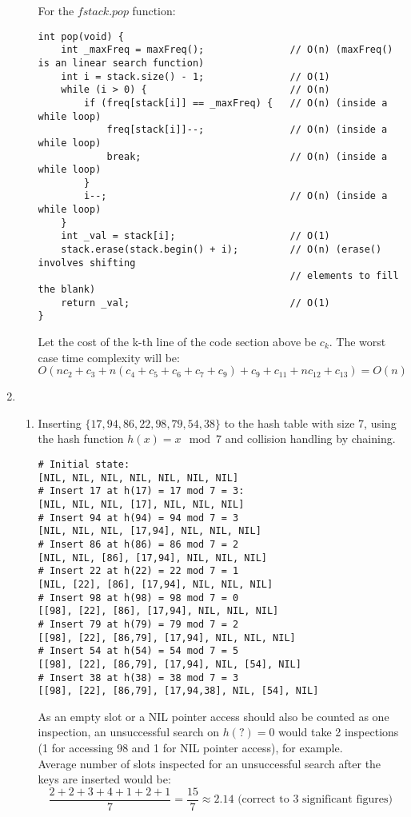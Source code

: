 \documentclass{article}
\begin{document}
\begin{enumerate}
\begin{enumerate}[label=(\alph*)]
        For the $fstack.pop$ function:
        \begin{verbatim}
int pop(void) {
    int _maxFreq = maxFreq();               // O(n) (maxFreq() is an linear search function)
    int i = stack.size() - 1;               // O(1)
    while (i > 0) {                         // O(n)
        if (freq[stack[i]] == _maxFreq) {   // O(n) (inside a while loop)
            freq[stack[i]]--;               // O(n) (inside a while loop)
            break;                          // O(n) (inside a while loop)
        }
        i--;                                // O(n) (inside a while loop)
    }
    int _val = stack[i];                    // O(1)
    stack.erase(stack.begin() + i);         // O(n) (erase() involves shifting
                                            // elements to fill the blank)
    return _val;                            // O(1)
}
        \end{verbatim}
        Let the cost of the k-th line of the code section above be $c_k$. The worst case time complexity will be:
        \[
        O(nc_2+c_3+n(c_4+c_5+c_6+c_7+c_9)+c_9+c_{11}+nc_{12}+c_{13}) = O(n)
        \]
    \end{enumerate}

\item
    \begin{enumerate}[label=(\alph*)]
        \item Inserting $\{17,94,86,22,98,79,54,38\}$ to the hash table with size 7, using the hash function $h(x) = x \mod 7$ and collision handling by chaining.
        \begin{verbatim}
# Initial state:
[NIL, NIL, NIL, NIL, NIL, NIL, NIL]
# Insert 17 at h(17) = 17 mod 7 = 3:
[NIL, NIL, NIL, [17], NIL, NIL, NIL]
# Insert 94 at h(94) = 94 mod 7 = 3
[NIL, NIL, NIL, [17,94], NIL, NIL, NIL]
# Insert 86 at h(86) = 86 mod 7 = 2
[NIL, NIL, [86], [17,94], NIL, NIL, NIL]
# Insert 22 at h(22) = 22 mod 7 = 1
[NIL, [22], [86], [17,94], NIL, NIL, NIL]
# Insert 98 at h(98) = 98 mod 7 = 0
[[98], [22], [86], [17,94], NIL, NIL, NIL]
# Insert 79 at h(79) = 79 mod 7 = 2
[[98], [22], [86,79], [17,94], NIL, NIL, NIL]
# Insert 54 at h(54) = 54 mod 7 = 5
[[98], [22], [86,79], [17,94], NIL, [54], NIL]
# Insert 38 at h(38) = 38 mod 7 = 3
[[98], [22], [86,79], [17,94,38], NIL, [54], NIL]
        \end{verbatim}
        As an empty slot or a NIL pointer access should also be counted as one inspection, an unsuccessful search on $h(?) = 0$ would take 2 inspections (1 for accessing 98 and 1 for NIL pointer access), for example. \\
        Average number of slots inspected for an unsuccessful search after the keys are inserted would be:
        \[
        \frac{2+2+3+4+1+2+1}{7} = \frac{15}{7} \approx 2.14 \text{ (correct to 3 significant figures)}
        \]


\end{enumerate}
\end{enumerate}
\end{document}
